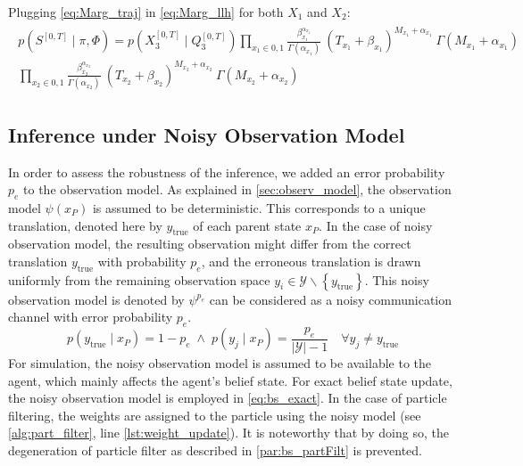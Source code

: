 Plugging \autoref{eq:Marg_traj} in \autoref{eq:Marg_llh} for both $ X_{1} $ and $ X_{2} $:
\begin{align}
\begin{split}
p(S^{[0,T]} \mid \pi, \Phi ) = p(X_{3}^{[0, T]}\mid Q_{3}^{[0, T]}) \prod_{x_{1}\in{0,1}} \frac{\beta_{x_{1}}^{\alpha_{x_{1}}}}{\Gamma(\alpha_{x_{1}})} \ (T_{x_{1}}+\beta_{x_{1}})^{M_{x_{1}} + \alpha_{x_{1}}}\ \Gamma(M_{x_{1}} + \alpha_{x_{1}})  \\  \prod_{x_{2}\in{0,1}} \frac{\beta_{x_{2}}^{\alpha_{x_{2}}}}{\Gamma(\alpha_{x_{2}})} \ (T_{x_{2}}+\beta_{x_{2}})^{M_{x_{2}} + \alpha_{x_{2}}}\ \Gamma(M_{x_{2}} + \alpha_{x_{2}})
\label{eq:Marg_llh_final}
\end{split}
\end{align}

\subsection{Inference under Noisy Observation Model}
\label{sec:noisy_robustness}
In order to assess the robustness of the inference, we added an error probability $ p_e $ to the observation model. As explained in \cref{sec:observ_model}, the observation model $ \psi(x_P) $ is assumed to be deterministic. This corresponds to a unique translation, denoted here by $ y_\text{true} $ of each parent state $ x_P $. In the case of noisy observation model, the resulting observation might differ from the correct translation $ y_\text{true} $ with probability $ p_e $, and the erroneous translation is drawn uniformly from the remaining observation space $ y_i \in \mathcal{Y} \backslash \left\lbrace y_\text{true}\right\rbrace $. This noisy observation model is denoted by $ \psi^{p_e} $ can be considered as a noisy communication channel with error probability $ p_e $. \begin{equation}
p(y_\text{true} \mid x_P) = 1-p_e \;\wedge \;p(y_j \mid x_P) = \frac{p_e}{|\mathcal{Y}|-1} \quad \forall y_j \neq y_\text{true}
\label{eq:noicy_obs_model}
\end{equation} 
For simulation, the noisy observation model is assumed to be available to the agent, which mainly affects the agent's belief state. For exact belief state update, the noisy observation model is employed in \autoref{eq:bs_exact}. In the case of particle filtering, the weights are assigned to the particle using the noisy model (see \cref{alg:part_filter}, line \autoref{lst:weight_update}). It is noteworthy that by doing so, the degeneration of particle filter as described in \cref{par:bs_partFilt} is prevented.
